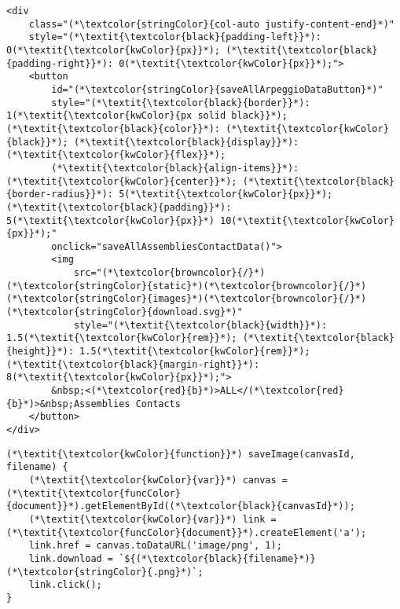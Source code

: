 \begin{lstlisting}[language=MyHTML, caption={[HTML \texttt{saveAllArpeggioDataButton} download button]\textbf{HTML \texttt{saveAllArpeggioDataButton} download button.} This HTML element contains a button (\texttt{saveAllArpeggioDataButton}) that downloads the pdbe-arpeggio protein-ligand contacts for all biological assemblies mapping to a protein segment. The JavaScript \texttt{saveAllAssembliesContactData} function is called upon clicking. A combination of Bootstrap classes and custom CSS is used for styling.}, label={html_button}]
<div
	class="(*\textcolor{stringColor}{col-auto justify-content-end}*)"
	style="(*\textit{\textcolor{black}{padding-left}}*): 0(*\textit{\textcolor{kwColor}{px}}*); (*\textit{\textcolor{black}{padding-right}}*): 0(*\textit{\textcolor{kwColor}{px}}*);">
	<button
		id="(*\textcolor{stringColor}{saveAllArpeggioDataButton}*)" 
		style="(*\textit{\textcolor{black}{border}}*): 1(*\textit{\textcolor{kwColor}{px solid black}}*); (*\textit{\textcolor{black}{color}}*): (*\textit{\textcolor{kwColor}{black}}*); (*\textit{\textcolor{black}{display}}*): (*\textit{\textcolor{kwColor}{flex}}*);
		(*\textit{\textcolor{black}{align-items}}*): (*\textit{\textcolor{kwColor}{center}}*); (*\textit{\textcolor{black}{border-radius}}*): 5(*\textit{\textcolor{kwColor}{px}}*); (*\textit{\textcolor{black}{padding}}*): 5(*\textit{\textcolor{kwColor}{px}}*) 10(*\textit{\textcolor{kwColor}{px}}*);" 
		onclick="saveAllAssembliesContactData()">
		<img
			src="(*\textcolor{browncolor}{/}*)(*\textcolor{stringColor}{static}*)(*\textcolor{browncolor}{/}*)(*\textcolor{stringColor}{images}*)(*\textcolor{browncolor}{/}*)(*\textcolor{stringColor}{download.svg}*)"
			style="(*\textit{\textcolor{black}{width}}*): 1.5(*\textit{\textcolor{kwColor}{rem}}*); (*\textit{\textcolor{black}{height}}*): 1.5(*\textit{\textcolor{kwColor}{rem}}*); (*\textit{\textcolor{black}{margin-right}}*): 8(*\textit{\textcolor{kwColor}{px}}*);">
		&nbsp;<(*\textcolor{red}{b}*)>ALL</(*\textcolor{red}{b}*)>&nbsp;Assemblies Contacts
	</button>
</div>
\end{lstlisting}

\begin{lstlisting}[language=MyJavaScript, caption={[JavaScript \texttt{saveImage} function]\textbf{JavaScript \texttt{saveImage} function.} \texttt{saveImage} JavaScript function as implemented in LIGYSIS-web. This function takes an HTML canvas element identifier (\texttt{canvasId}) and a file name (\texttt{filename}) and saves a screenshot as a PNG file. It is used to save images from the Chart.js graphs as well as the 3Dmol.js viewer.}, label={saveimage_func}]
(*\textit{\textcolor{kwColor}{function}}*) saveImage(canvasId, filename) {
	(*\textit{\textcolor{kwColor}{var}}*) canvas = (*\textit{\textcolor{funcColor}{document}}*).getElementById((*\textcolor{black}{canvasId}*));
	(*\textit{\textcolor{kwColor}{var}}*) link = (*\textit{\textcolor{funcColor}{document}}*).createElement('a');
	link.href = canvas.toDataURL('image/png', 1);
	link.download = `${(*\textcolor{black}{filename}*)}(*\textcolor{stringColor}{.png}*)`;
	link.click();
}
\end{lstlisting}

